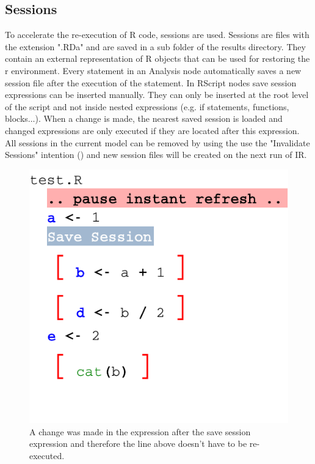 \begin{remark}
\section{Sessions}
To accelerate the re-execution of R code, sessions are used. Sessions are files with the extension ".RDa" and are saved in a sub folder of the results directory.
They contain an external representation of R objects that can be used for restoring the r environment. Every statement in an Analysis node automatically saves
a new session file after the execution of the statement. In RScript nodes save session expressions can be inserted manually. They can only be inserted at the
root level of the script and not inside nested expressions (e.g. if statements, functions, blocks...). When a change is made, the nearest saved session is loaded
and changed expressions are only executed if they are located after this expression. All sessions in the current model can be removed by using the use the "Invalidate Sessions" intention (\intentionLightBulb)
 and new session files will be created on the next run of IR.
\begin{figure}[h!tbp]
  \centering
  \includegraphics[width=\figWidthNarrow]{figures/IRPauseAndSessionExpression.pdf}
\caption[Sessions affect the list of changed nodes]{A change was made in the expression after the save session expression and therefore the line above doesn't have to be re-executed.}
\end{figure}
\end{remark}